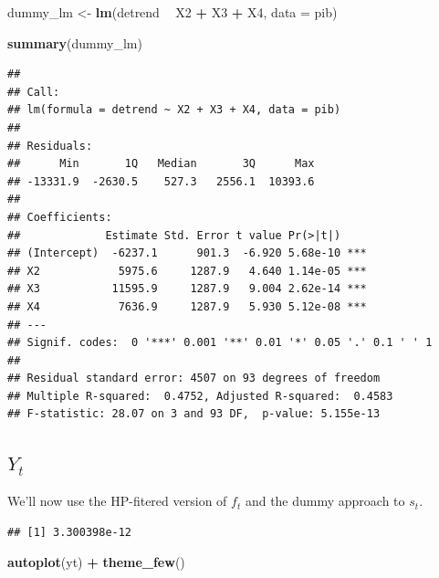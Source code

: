 \documentclass[]{article}
\newenvironment{Shaded}{\begin{snugshade}}{\end{snugshade}}
\newcommand{\DataTypeTok}[1]{\textcolor[rgb]{0.13,0.29,0.53}{#1}}
\newcommand{\KeywordTok}[1]{\textcolor[rgb]{0.13,0.29,0.53}{\textbf{#1}}}
\newcommand{\NormalTok}[1]{#1}
\newcommand{\OperatorTok}[1]{\textcolor[rgb]{0.81,0.36,0.00}{\textbf{#1}}}
\newcommand{\StringTok}[1]{\textcolor[rgb]{0.31,0.60,0.02}{#1}}
\begin{document}
\begin{Shaded}
\begin{Highlighting}[]
\NormalTok{dummy_lm <-}\StringTok{ }\KeywordTok{lm}\NormalTok{(detrend }\OperatorTok{~}\StringTok{ }\NormalTok{X2 }\OperatorTok{+}\StringTok{ }\NormalTok{X3 }\OperatorTok{+}\StringTok{ }\NormalTok{X4, }\DataTypeTok{data =}\NormalTok{ pib)}
  
\KeywordTok{summary}\NormalTok{(dummy_lm)}
\end{Highlighting}
\end{Shaded}

\begin{verbatim}
## 
## Call:
## lm(formula = detrend ~ X2 + X3 + X4, data = pib)
## 
## Residuals:
##      Min       1Q   Median       3Q      Max 
## -13331.9  -2630.5    527.3   2556.1  10393.6 
## 
## Coefficients:
##             Estimate Std. Error t value Pr(>|t|)    
## (Intercept)  -6237.1      901.3  -6.920 5.68e-10 ***
## X2            5975.6     1287.9   4.640 1.14e-05 ***
## X3           11595.9     1287.9   9.004 2.62e-14 ***
## X4            7636.9     1287.9   5.930 5.12e-08 ***
## ---
## Signif. codes:  0 '***' 0.001 '**' 0.01 '*' 0.05 '.' 0.1 ' ' 1
## 
## Residual standard error: 4507 on 93 degrees of freedom
## Multiple R-squared:  0.4752, Adjusted R-squared:  0.4583 
## F-statistic: 28.07 on 3 and 93 DF,  p-value: 5.155e-13
\end{verbatim}

\subsection{$Y_t$}

We'll now use the HP-fitered version of \(f_t\) and the dummy approach
to \(s_t\).

\begin{Shaded}
\end{Shaded}

\begin{verbatim}
## [1] 3.300398e-12
\end{verbatim}

\begin{Shaded}
\begin{Highlighting}[]
\KeywordTok{autoplot}\NormalTok{(yt) }\OperatorTok{+}\StringTok{ }\KeywordTok{theme_few}\NormalTok{()}
\end{Highlighting}
\end{Shaded}
\end{document}

